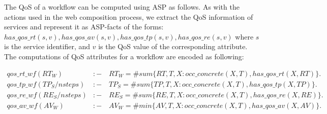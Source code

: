 \documentclass{new_tlp}
\begin{document}
The QoS of a workflow can be computed using ASP as follows. 
As with the actions used in the web composition process, we extract the QoS information of services and represent it as ASP-facts  
of the forms: $has\_qos\_rt(s, v),has\_qos\_av(s, v),has\_qos\_tp(s, v),has\_qos\_re(s, v)$ where $s$ is the service identifier, and $v$ is 
the QoS value of the corresponding attribute. The computations of QoS attributes for a workflow are encoded as following:


%
%
%

{\footnotesize
\[
	\begin{array}{ll}
	qos\_rt\_wf(RT_{W}) & {:}{- }\quad RT_{W} = \#sum\{RT,T,X : occ\_concrete(X,T),has\_qos\_rt(X,RT)\}. \\
	qos\_tp\_wf(TP_{S}/nsteps)& {:}{-}\quad TP_{S} = \#sum\{TP,T,X : occ\_concrete(X,T),has\_qos\_tp(X,TP)\}.\\
	qos\_re\_wf(RE_{S}/nsteps) &{:}{-}\quad RE_{S} = \#sum\{RE,T,X : occ\_concrete(X,T),has\_qos\_re(X,RE)\}.\\
          qos\_av\_wf(AV_{W}) &{:}{-}\quad AV_{W} = \#min\{AV,T,X : occ\_concrete(X,T),has\_qos\_av(X,AV)\}.
\end{array}
\]}
\end{document}
